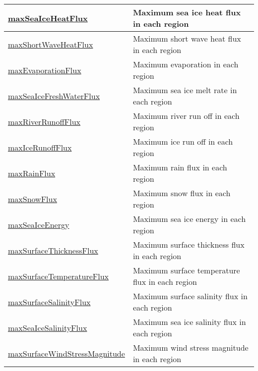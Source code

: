 {\begin{center}
\begin{longtable}{| p{2.0in} | p{4.0in} |}
    \hline
    \hyperref[subsec:var_sec_surfaceAreaWeightedAveragesAM_maxSeaIceHeatFlux]{maxSeaIceHeatFlux} & Maximum sea ice heat flux in each region \\
    \hline
    \hyperref[subsec:var_sec_surfaceAreaWeightedAveragesAM_maxShortWaveHeatFlux]{maxShortWaveHeatFlux} & Maximum short wave heat flux in each region \\
    \hline
    \hyperref[subsec:var_sec_surfaceAreaWeightedAveragesAM_maxEvaporationFlux]{maxEvaporationFlux} & Maximum evaporation in each region \\
    \hline
    \hyperref[subsec:var_sec_surfaceAreaWeightedAveragesAM_maxSeaIceFreshWaterFlux]{maxSeaIceFreshWaterFlux} & Maximum sea ice melt rate in each region \\
    \hline
    \hyperref[subsec:var_sec_surfaceAreaWeightedAveragesAM_maxRiverRunoffFlux]{maxRiverRunoffFlux} & Maximum river run off in each region \\
    \hline
    \hyperref[subsec:var_sec_surfaceAreaWeightedAveragesAM_maxIceRunoffFlux]{maxIceRunoffFlux} & Maximum ice run off in each region \\
    \hline
    \hyperref[subsec:var_sec_surfaceAreaWeightedAveragesAM_maxRainFlux]{maxRainFlux} & Maximum rain flux in each region \\
    \hline
    \hyperref[subsec:var_sec_surfaceAreaWeightedAveragesAM_maxSnowFlux]{maxSnowFlux} & Maximum snow flux in each region \\
    \hline
    \hyperref[subsec:var_sec_surfaceAreaWeightedAveragesAM_maxSeaIceEnergy]{maxSeaIceEnergy} & Maximum sea ice energy in each region \\
    \hline
    \hyperref[subsec:var_sec_surfaceAreaWeightedAveragesAM_maxSurfaceThicknessFlux]{maxSurfaceThicknessFlux} & Maximum surface thickness flux in each region \\
    \hline
    \hyperref[subsec:var_sec_surfaceAreaWeightedAveragesAM_maxSurfaceTemperatureFlux]{maxSurfaceTemperatureFlux} & Maximum surface temperature flux in each region \\
    \hline
    \hyperref[subsec:var_sec_surfaceAreaWeightedAveragesAM_maxSurfaceSalinityFlux]{maxSurfaceSalinityFlux} & Maximum surface salinity flux in each region \\
    \hline
    \hyperref[subsec:var_sec_surfaceAreaWeightedAveragesAM_maxSeaIceSalinityFlux]{maxSeaIceSalinityFlux} & Maximum sea ice salinity flux in each region \\
    \hline
    \hyperref[subsec:var_sec_surfaceAreaWeightedAveragesAM_maxSurfaceWindStressMagnitude]{maxSurfaceWindStressMagnitude} & Maximum wind stress magnitude in each region \\

\end{longtable}
\end{center}}
